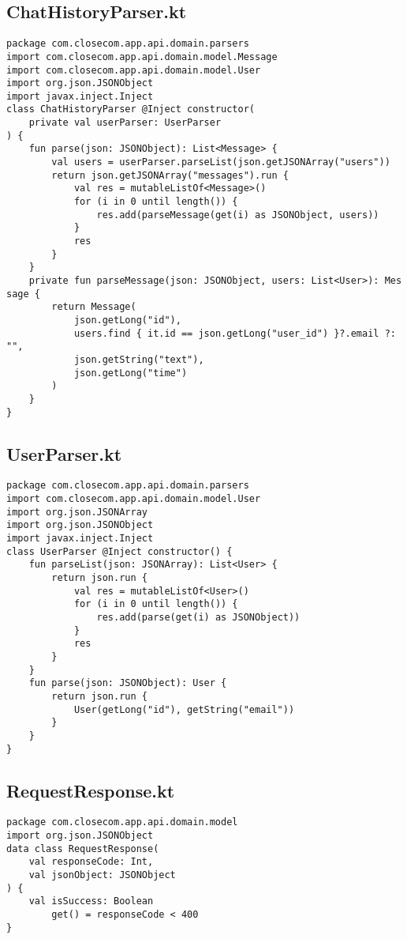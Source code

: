 \documentclass[listing]{espd}
\begin{document}
\subsection{ChatHistoryParser.kt}
\begin{verbatim}
package com.closecom.app.api.domain.parsers
import com.closecom.app.api.domain.model.Message
import com.closecom.app.api.domain.model.User
import org.json.JSONObject
import javax.inject.Inject
class ChatHistoryParser @Inject constructor(
    private val userParser: UserParser
) {
    fun parse(json: JSONObject): List<Message> {
        val users = userParser.parseList(json.getJSONArray("users"))
        return json.getJSONArray("messages").run {
            val res = mutableListOf<Message>()
            for (i in 0 until length()) {
                res.add(parseMessage(get(i) as JSONObject, users))
            }
            res
        }
    }
    private fun parseMessage(json: JSONObject, users: List<User>): Mes
sage {
        return Message(
            json.getLong("id"),
            users.find { it.id == json.getLong("user_id") }?.email ?: 
"",
            json.getString("text"),
            json.getLong("time")
        )
    }
}
\end{verbatim}

\subsection{UserParser.kt}
\begin{verbatim}
package com.closecom.app.api.domain.parsers
import com.closecom.app.api.domain.model.User
import org.json.JSONArray
import org.json.JSONObject
import javax.inject.Inject
class UserParser @Inject constructor() {
    fun parseList(json: JSONArray): List<User> {
        return json.run {
            val res = mutableListOf<User>()
            for (i in 0 until length()) {
                res.add(parse(get(i) as JSONObject))
            }
            res
        }
    }
    fun parse(json: JSONObject): User {
        return json.run {
            User(getLong("id"), getString("email"))
        }
    }
}
\end{verbatim}

\subsection{RequestResponse.kt}
\begin{verbatim}
package com.closecom.app.api.domain.model
import org.json.JSONObject
data class RequestResponse(
    val responseCode: Int,
    val jsonObject: JSONObject
) {
    val isSuccess: Boolean
        get() = responseCode < 400
}
\end{verbatim}
\end{document}
